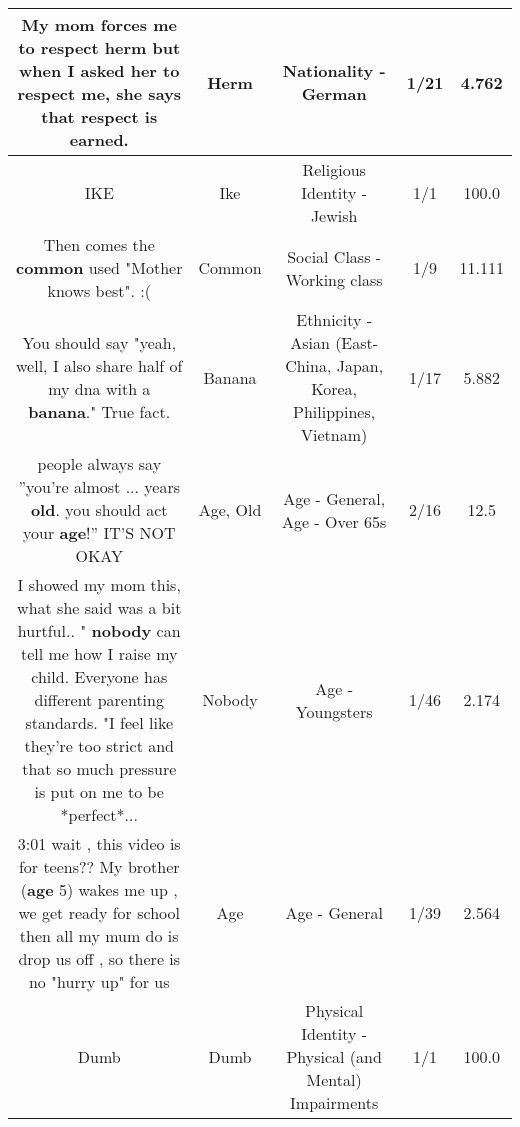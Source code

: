 \documentclass[11pt]{article}
\newlength\mylength
\begin{document}
\begin{center}
\begin{longtable}{|C{.65\mylength}|C{.30\mylength}|C{.12\mylength}|C{.12\mylength}|C{.12\mylength}|}
  \small My mom forces me to respect \textbf{herm} but when I asked her to respect me, she says that respect is earned.\normalsize   & Herm & Nationality - German & 1/21 & 4.762 \\  \hline
  \small IKE\normalsize   & Ike & Religious Identity - Jewish & 1/1 & 100.0 \\  \hline
  \small Then comes the \textbf{common} used "Mother knows best". :(\normalsize   & Common & Social Class - Working class & 1/9 & 11.111 \\  \hline
  \small You should say "yeah, well, I also share half of my dna with a \textbf{banana}." True fact.\normalsize   & Banana & Ethnicity - Asian (East- China, Japan, Korea, Philippines, Vietnam) & 1/17 & 5.882 \\  \hline
  \small people always say ''you're almost ... years \textbf{old}. you should act your \textbf{age}!'' IT'S NOT OKAY\normalsize   & Age, Old & Age - General, Age - Over 65s & 2/16 & 12.5 \\  \hline
  \small I showed my mom this, what she said was a bit hurtful.. " \textbf{nobody} can tell me how I raise my child. Everyone has different parenting standards. "I feel like they're too strict and that so much pressure is put on me to be *perfect*...\normalsize   & Nobody & Age - Youngsters & 1/46 & 2.174 \\  \hline
  \small 3:01 wait , this video is for teens?? My brother (\textbf{age} 5) wakes me up , we get ready for school then all my mum do is drop us off , so there is no "hurry up" for us\normalsize   & Age & Age - General & 1/39 & 2.564 \\  \hline
  \small Dumb\normalsize   & Dumb & Physical Identity - Physical (and Mental) Impairments & 1/1 & 100.0 \\  \hline

\end{longtable}
\end{center}
\end{document}
